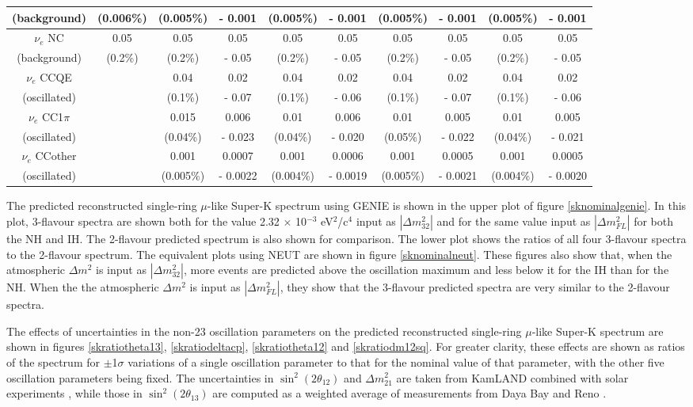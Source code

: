 \begin{table}
\begin{tabular}{| c | c | c | c | c | c | c | c | c | c |}
(background) & (0.006\%) &  (0.005\%) & - 0.001 &  (0.005\%) & - 0.001 &  (0.005\%) & - 0.001 &  (0.005\%) & - 0.001 \\
\hline
$\nu_{e}$ NC & 0.05 &  0.05 & 0.05 & 0.05 & 0.05 & 0.05 & 0.05 & 0.05 & 0.05 \\
(background) & (0.2\%) &  (0.2\%) & - 0.05 &  (0.2\%) & - 0.05 &  (0.2\%) & - 0.05 &  (0.2\%) & - 0.05 \\
\hline
$\nu_{e}$ CCQE &  &  0.04 & 0.02 & 0.04 & 0.02 & 0.04 & 0.02 & 0.04 & 0.02 \\
(oscillated) &  &  (0.1\%) & - 0.07 & (0.1\%) & - 0.06 & (0.1\%) & - 0.07 & (0.1\%) & - 0.06 \\
\hline
$\nu_{e}$ CC1$\pi$ &   &  0.015 & 0.006 & 0.01 & 0.006& 0.01 & 0.005 & 0.01 & 0.005 \\
(oscillated) &  &  (0.04\%) & - 0.023 & (0.04\%) & - 0.020 & (0.05\%) & - 0.022 & (0.04\%) & - 0.021 \\
\hline
$\nu_{e}$ CCother &  &  0.001 & 0.0007 &  0.001 & 0.0006 & 0.001 & 0.0005 & 0.001 & 0.0005 \\
(oscillated) &  &  (0.005\%) & - 0.0022 &  (0.004\%) & - 0.0019 &  (0.005\%) & - 0.0021 &  (0.004\%) & - 0.0020\\
\hline
\end{tabular}
\label{neuteventnumbers}
\end{table}


The predicted reconstructed single-ring $\mu$-like Super-K spectrum using GENIE is shown in the upper plot of figure \ref{sknominalgenie}. In this plot, 
3-flavour spectra are shown both for the value 2.32 $\times$ 10$^{-3}$ eV$^{2}$/c$^{4}$ input as $|\Delta m_{32}^{2}|$ and for the same value input as 
$|\Delta m_{FL}^{2}|$ for both the NH and IH. The 2-flavour predicted spectrum is also shown for comparison. The lower plot shows the ratios of all four 
3-flavour spectra to the 2-flavour spectrum. The equivalent plots using NEUT are shown in figure \ref{sknominalneut}. These figures also show that, when 
the atmospheric $\Delta m^{2}$ is input as $|\Delta m_{32}^{2}|$, more events are predicted above the oscillation maximum and less below it for the IH 
than for the NH. When the the atmospheric $\Delta m^{2}$ is input as $|\Delta m_{FL}^{2}|$, they show that the 3-flavour predicted spectra are very similar 
to the 2-flavour spectra.

The effects of uncertainties in the non-23 oscillation parameters on the predicted reconstructed single-ring $\mu$-like Super-K spectrum are 
shown in figures \ref{skratiotheta13}, \ref{skratiodeltacp}, \ref{skratiotheta12} and \ref{skratiodm12sq}. For greater clarity, these effects are shown 
as ratios of the spectrum for $\pm$1$\sigma$ variations of a single oscillation parameter to that for the nominal value of that parameter, with the 
other five oscillation parameters being fixed. The uncertainties in $\sin^{2}(2 \theta_{12})$ and $\Delta m_{21}^{2}$ are taken from KamLAND combined 
with solar experiments \cite{Kamland}, while those in $\sin^{2}(2 \theta_{13})$ are computed as a weighted average of measurements from Daya Bay 
\cite{DayaBay} and Reno \cite{Reno}. 

